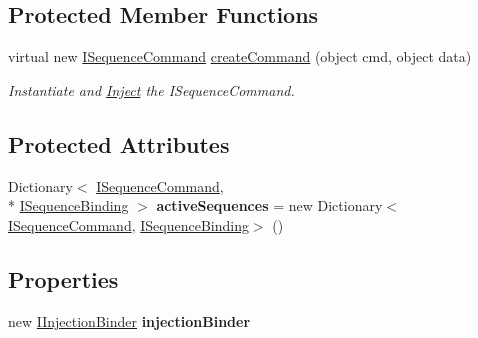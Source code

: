 \subsection*{Protected Member Functions}
\begin{DoxyCompactItemize}
\item 
\hypertarget{classstrange_1_1extensions_1_1sequencer_1_1impl_1_1_sequencer_a6e1c819a7c2fe3fa12a40452ee622492}{virtual new \hyperlink{interfacestrange_1_1extensions_1_1sequencer_1_1api_1_1_i_sequence_command}{I\-Sequence\-Command} \hyperlink{classstrange_1_1extensions_1_1sequencer_1_1impl_1_1_sequencer_a6e1c819a7c2fe3fa12a40452ee622492}{create\-Command} (object cmd, object data)}\label{classstrange_1_1extensions_1_1sequencer_1_1impl_1_1_sequencer_a6e1c819a7c2fe3fa12a40452ee622492}

\begin{DoxyCompactList}\small\item\em Instantiate and \hyperlink{class_inject}{Inject} the I\-Sequence\-Command. \end{DoxyCompactList}\end{DoxyCompactItemize}
\subsection*{Protected Attributes}
\begin{DoxyCompactItemize}
\item 
\hypertarget{classstrange_1_1extensions_1_1sequencer_1_1impl_1_1_sequencer_a261872a431887f3d6056cc7ac01ecd9a}{Dictionary$<$ \hyperlink{interfacestrange_1_1extensions_1_1sequencer_1_1api_1_1_i_sequence_command}{I\-Sequence\-Command}, \\*
\hyperlink{interfacestrange_1_1extensions_1_1sequencer_1_1api_1_1_i_sequence_binding}{I\-Sequence\-Binding} $>$ {\bfseries active\-Sequences} = new Dictionary$<$\hyperlink{interfacestrange_1_1extensions_1_1sequencer_1_1api_1_1_i_sequence_command}{I\-Sequence\-Command}, \hyperlink{interfacestrange_1_1extensions_1_1sequencer_1_1api_1_1_i_sequence_binding}{I\-Sequence\-Binding}$>$ ()}\label{classstrange_1_1extensions_1_1sequencer_1_1impl_1_1_sequencer_a261872a431887f3d6056cc7ac01ecd9a}

\end{DoxyCompactItemize}
\subsection*{Properties}
\begin{DoxyCompactItemize}
\item 
\hypertarget{classstrange_1_1extensions_1_1sequencer_1_1impl_1_1_sequencer_a99cc8177a4eee4c38083a6de24daac1b}{new \hyperlink{interfacestrange_1_1extensions_1_1injector_1_1api_1_1_i_injection_binder}{I\-Injection\-Binder} {\bfseries injection\-Binder}}\label{classstrange_1_1extensions_1_1sequencer_1_1impl_1_1_sequencer_a99cc8177a4eee4c38083a6de24daac1b}

\end{DoxyCompactItemize}


